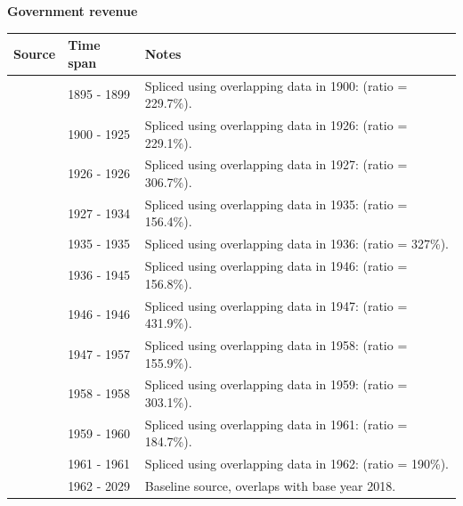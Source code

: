 \documentclass[12pt,a4paper,landscape]{article}
\begin{document}
\begin{adjustbox}{max totalsize={\paperwidth}{\paperheight},center}
\begin{minipage}[t][\textheight][t]{\textwidth}
\vspace*{0.5cm}
{}
\begin{center}
{\Large\bfseries Government revenue}
\end{center}
\vspace{0.5cm}
\begin{table}[H]
\centering
\small
\begin{tabular}{|l|l|l|}
\hline
\textbf{Source} & \textbf{Time span} & \textbf{Notes} \\
\hline
\rowcolor{white}\cite{Mitchell}& 1895 - 1899 &Spliced using overlapping data in 1900: (ratio = 229.7\%). \\
\rowcolor{lightgray}\cite{JERVEN}& 1900 - 1925 &Spliced using overlapping data in 1926: (ratio = 229.1\%). \\
\rowcolor{white}\cite{Mitchell}& 1926 - 1926 &Spliced using overlapping data in 1927: (ratio = 306.7\%). \\
\rowcolor{lightgray}\cite{JERVEN}& 1927 - 1934 &Spliced using overlapping data in 1935: (ratio = 156.4\%). \\
\rowcolor{white}\cite{Mitchell}& 1935 - 1935 &Spliced using overlapping data in 1936: (ratio = 327\%). \\
\rowcolor{lightgray}\cite{JERVEN}& 1936 - 1945 &Spliced using overlapping data in 1946: (ratio = 156.8\%). \\
\rowcolor{white}\cite{Mitchell}& 1946 - 1946 &Spliced using overlapping data in 1947: (ratio = 431.9\%). \\
\rowcolor{lightgray}\cite{JERVEN}& 1947 - 1957 &Spliced using overlapping data in 1958: (ratio = 155.9\%). \\
\rowcolor{white}\cite{Mitchell}& 1958 - 1958 &Spliced using overlapping data in 1959: (ratio = 303.1\%). \\
\rowcolor{lightgray}\cite{GMD_estimated}& 1959 - 1960 &Spliced using overlapping data in 1961: (ratio = 184.7\%). \\
\rowcolor{white}\cite{JERVEN}& 1961 - 1961 &Spliced using overlapping data in 1962: (ratio = 190\%). \\
\rowcolor{lightgray}\cite{GMD_estimated}& 1962 - 2029 &Baseline source, overlaps with base year 2018. \\
\hline
\end{tabular}

\end{table}
\end{minipage}
\end{adjustbox}
\end{document}
